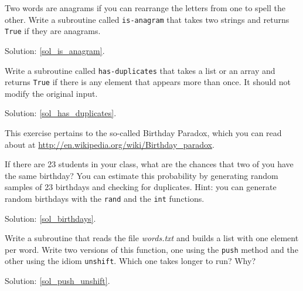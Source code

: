 \begin{exercise}

\label{is_anagram}
Two words are anagrams if you can rearrange the letters 
from one to spell the other.  Write a subroutine called 
\verb"is-anagram" that takes two strings and returns 
{\tt True} if they are anagrams.

Solution: \ref{sol_is_anagram}.

\end{exercise}



\begin{exercise}
\label{has_duplicates}

Write a subroutine called \verb"has-duplicates" that takes
a list or an array and returns {\tt True} if there is 
any element that appears more than once.  It should 
not modify the original input.

Solution: \ref{sol_has_duplicates}.

\end{exercise}


\begin{exercise}

This exercise pertains to the so-called Birthday Paradox, 
which you can read about at 
\url{http://en.wikipedia.org/wiki/Birthday_paradox}.
\label{birthdays}

If there are 23 students in your class, what are the 
chances that two of you have the same birthday?  You 
can estimate this probability by generating random 
samples of 23 birthdays and checking for duplicates. 
Hint: you can generate random birthdays
with the {\tt rand} and the {\tt int} functions.

Solution: \ref{sol_birthdays}.

\end{exercise}



\begin{exercise}

\label{push_unshift}
Write a subroutine that reads the file \emph{words.txt} and builds
a list with one element per word.  Write two versions of
this function, one using the {\tt push} method and the
other using the idiom {\tt unshift}.  Which one takes
longer to run?  Why?

Solution: \ref{sol_push_unshift}.


\end{exercise}


